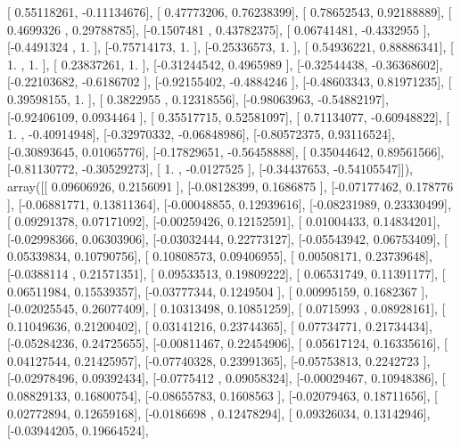 \documentclass{article}
\begin{document}
       [ 0.55118261, -0.11134676],
       [ 0.47773206,  0.76238399],
       [ 0.78652543,  0.92188889],
       [ 0.4699326 ,  0.29788785],
       [-0.1507481 ,  0.43782375],
       [ 0.06741481, -0.4332955 ],
       [-0.4491324 ,  1.        ],
       [-0.75714173,  1.        ],
       [-0.25336573,  1.        ],
       [ 0.54936221,  0.88886341],
       [ 1.        ,  1.        ],
       [ 0.23837261,  1.        ],
       [-0.31244542,  0.4965989 ],
       [-0.32544438, -0.36368602],
       [-0.22103682, -0.6186702 ],
       [-0.92155402, -0.4884246 ],
       [-0.48603343,  0.81971235],
       [ 0.39598155,  1.        ],
       [ 0.3822955 ,  0.12318556],
       [-0.98063963, -0.54882197],
       [-0.92406109,  0.0934464 ],
       [ 0.35517715,  0.52581097],
       [ 0.71134077, -0.60948822],
       [ 1.        , -0.40914948],
       [-0.32970332, -0.06848986],
       [-0.80572375,  0.93116524],
       [-0.30893645,  0.01065776],
       [-0.17829651, -0.56458888],
       [ 0.35044642,  0.89561566],
       [-0.81130772, -0.30529273],
       [ 1.        , -0.0127525 ],
       [-0.34437653, -0.54105547]]), array([[ 0.09606926,  0.2156091 ],
       [-0.08128399,  0.1686875 ],
       [-0.07177462,  0.178776  ],
       [-0.06881771,  0.13811364],
       [-0.00048855,  0.12939616],
       [-0.08231989,  0.23330499],
       [ 0.09291378,  0.07171092],
       [-0.00259426,  0.12152591],
       [ 0.01004433,  0.14834201],
       [-0.02998366,  0.06303906],
       [-0.03032444,  0.22773127],
       [-0.05543942,  0.06753409],
       [ 0.05339834,  0.10790756],
       [ 0.10808573,  0.09406955],
       [ 0.00508171,  0.23739648],
       [-0.0388114 ,  0.21571351],
       [ 0.09533513,  0.19809222],
       [ 0.06531749,  0.11391177],
       [ 0.06511984,  0.15539357],
       [-0.03777344,  0.1249504 ],
       [ 0.00995159,  0.1682367 ],
       [-0.02025545,  0.26077409],
       [ 0.10313498,  0.10851259],
       [ 0.0715993 ,  0.08928161],
       [ 0.11049636,  0.21200402],
       [ 0.03141216,  0.23744365],
       [ 0.07734771,  0.21734434],
       [-0.05284236,  0.24725655],
       [-0.00811467,  0.22454906],
       [ 0.05617124,  0.16335616],
       [ 0.04127544,  0.21425957],
       [-0.07740328,  0.23991365],
       [-0.05753813,  0.2242723 ],
       [-0.02978496,  0.09392434],
       [-0.0775412 ,  0.09058324],
       [-0.00029467,  0.10948386],
       [ 0.08829133,  0.16800754],
       [-0.08655783,  0.1608563 ],
       [-0.02079463,  0.18711656],
       [ 0.02772894,  0.12659168],
       [-0.0186698 ,  0.12478294],
       [ 0.09326034,  0.13142946],
       [-0.03944205,  0.19664524],
\end{document}
